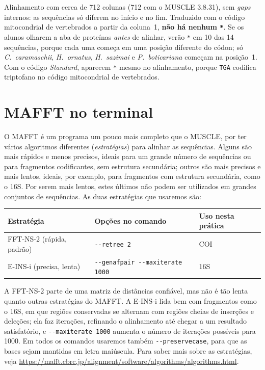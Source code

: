 \documentclass[11pt,a4paper]{article}
\newcommand{\ui}[1]{\textit{#1}}
\begin{document}
\begin{resposta}
Alinhamento com cerca de 712 colunas (712 com o MUSCLE 3.8.31), sem \emph{gaps} internos:
as sequências só diferem no início e no fim. Traduzido com o código mitocondrial de
vertebrados a partir da coluna~1, \textbf{não há nenhum \texttt{*}}. Se os alunos olharem a
aba de proteínas \emph{antes} de alinhar, verão \texttt{*} em 10 das 14 sequências, porque
cada uma começa em uma posição diferente do códon; só \emph{C.~caramaschii}, \emph{H.~ornatus},
\emph{H.~sazimai} e \emph{P.~boticariana} começam na posição~1. Com o código \ui{Standard},
aparecem \texttt{*} mesmo no alinhamento, porque \texttt{TGA} codifica triptofano no código
mitocondrial de vertebrados.
\end{resposta}

\section{MAFFT no terminal}\label{sec:mafft}

O MAFFT é um programa um pouco mais completo que o MUSCLE, por ter vários algoritmos
diferentes (\emph{estratégias}) para alinhar as sequências. Alguns são mais rápidos e menos
precisos, ideais para um grande número de sequências ou para fragmentos codificantes, sem
estrutura secundária; outros são mais precisos e mais lentos, ideais, por exemplo, para
fragmentos com estrutura secundária, como o 16S. Por serem mais lentos, estes últimos não podem
ser utilizados em grandes conjuntos de sequências. As duas estratégias que usaremos são:

\begin{center}
\begin{tabular}{@{}lll@{}}
\toprule
Estratégia & Opções no comando & Uso nesta prática \\
\midrule
FFT-NS-2 (rápida, padrão) & \verb|--retree 2| & COI \\
E-INS-i (precisa, lenta) & \verb|--genafpair --maxiterate 1000| & 16S \\
\bottomrule
\end{tabular}
\end{center}

A FFT-NS-2 parte de uma matriz de distâncias confiável, mas não é tão lenta quanto outras
estratégias do MAFFT. A E-INS-i lida bem com fragmentos como o 16S, em que regiões conservadas
se alternam com regiões cheias de inserções e deleções; ela faz iterações, refinando o
alinhamento até chegar a um resultado satisfatório, e \verb|--maxiterate 1000| aumenta o
número de iterações possíveis para 1000. Em todos os comandos usaremos também
\verb|--preservecase|, para que as bases sejam mantidas em letra maiúscula. Para saber mais
sobre as estratégias, veja
\url{https://mafft.cbrc.jp/alignment/software/algorithms/algorithms.html}.
\end{document}
